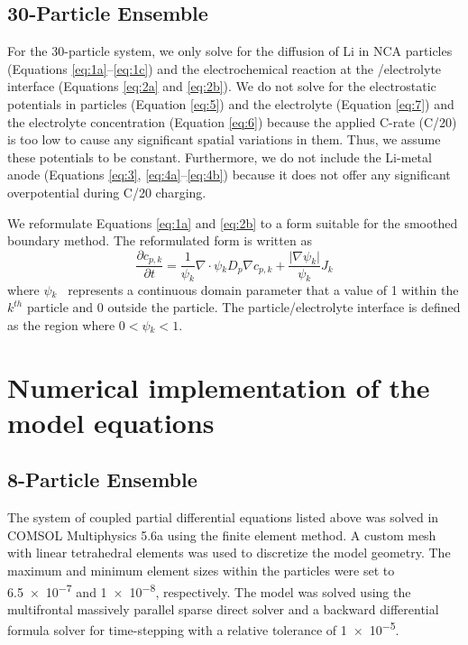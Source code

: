 \documentclass{article}
\begin{document}
\subsection{30-Particle Ensemble}

For the 30-particle system, we only solve for the diffusion of Li in
NCA particles (Equations \ref{eq:1a}--\ref{eq:1c}) and the
electrochemical reaction at the \nca{}/electrolyte interface
(Equations \ref{eq:2a} and \ref{eq:2b}). We do not solve for the
electrostatic potentials in \nca{} particles (Equation \ref{eq:5}) and
the electrolyte (Equation \ref{eq:7}) and the electrolyte
concentration (Equation \ref{eq:6}) because the applied C-rate (C/20)
is too low to cause any significant spatial variations in them. Thus,
we assume these potentials to be constant.  Furthermore, we do not
include the Li-metal anode (Equations \ref{eq:3},
\ref{eq:4a}--\ref{eq:4b}) because it does not offer any significant
overpotential during C/20 charging.

We reformulate Equations \ref{eq:1a} and \ref{eq:2b} to a form suitable
for the smoothed boundary method\cite{thornton2012,thornton2018}. The
reformulated form is written as\cite{thornton2018}
\begin{equation}
  \frac{\partial c_{p,k}}{\partial t}=\frac 1{\psi{}_k}\nabla \cdot \psi{}_kD_p\nabla c_{p,k}+\frac{\left|\nabla \psi{}_k\right|}{\psi{}_k}J_k
  \label{eq:8}
\end{equation}
where $\psi{}_k$ \ represents a continuous domain parameter that a
value of 1 within the $k^{\mathit{th}}$ particle and 0 outside the
particle. The particle/electrolyte interface is defined as the region
where $ 0 < \psi{}_k < 1 $.


\section{Numerical implementation of the model equations}

\subsection{8-Particle Ensemble}

The system of coupled partial differential equations listed above was
solved in COMSOL Multiphysics 5.6a using the finite element method. A
custom mesh with linear tetrahedral elements was used to discretize
the model geometry. The maximum and minimum element sizes within the
\nca{} particles were set to \num{6.5e-7} and \num{1e-8},
respectively. The model was solved using the multifrontal massively
parallel sparse direct solver \cite{lexcellent2000} and a backward differential
formula solver for time-stepping with a relative tolerance of
\num{1e-5}.
\end{document}
